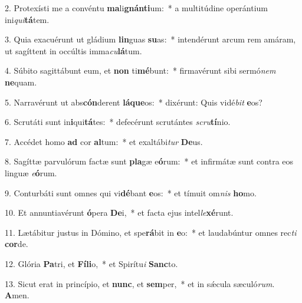 2. Protexísti me a convéntu \textbf{ma}li\textbf{gnán}\textbf{ti}um:~*  a multitúdine operántium ini\textit{qui}\textbf{tá}tem.\

3. Quia exacuérunt ut gládium \textbf{lin}guas \textbf{su}as:~*  intendérunt arcum rem amáram, ut sagíttent in occúltis imma\textit{cu}\textbf{lá}tum.\

4. Súbito sagittábunt eum, et \textbf{non} ti\textbf{mé}bunt:~*  firmavérunt sibi sermó\textit{nem} \textbf{ne}quam.\

5. Narravérunt ut abs\textbf{cón}derent \textbf{lá}\textbf{que}os:~*  dixérunt: Quis vidé\textit{bit} \textbf{e}os?\

6. Scrutáti sunt in\textbf{i}qui\textbf{tá}tes:~*  defecérunt scrutántes \textit{scru}\textbf{tí}nio.\

7. Accédet homo \textbf{ad} cor \textbf{al}tum:~*  et exaltábi\textit{tur} \textbf{De}us.\

8. Sagíttæ parvulórum factæ sunt \textbf{pla}gæ e\textbf{ó}rum:~*  et infirmátæ sunt contra eos linguæ \textit{e}\textbf{ó}rum.\

9. Conturbáti sunt omnes qui vi\textbf{dé}bant \textbf{e}os:~*  et tímuit om\textit{nis} \textbf{ho}mo.\

10. Et annuntiavérunt \textbf{ó}pera \textbf{De}i,~*  et facta ejus intel\textit{le}\textbf{xé}runt.\

11. Lætábitur justus in Dómino, et spe\textbf{rá}bit in \textbf{e}o:~*  et laudabúntur omnes rec\textit{ti} \textbf{cor}de.\

12. Glória \textbf{Pa}tri, et \textbf{Fí}\textbf{li}o,~*  et Spirítu\textit{i} \textbf{Sanc}to.\

13. Sicut erat in princípio, et \textbf{nunc}, et \textbf{sem}per,~*  et in sǽcula sæculó\textit{rum}. \textbf{A}men.\


